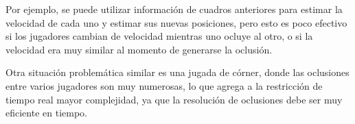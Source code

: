 Por ejemplo, se puede utilizar información de cuadros anteriores para
estimar la velocidad de cada uno y estimar sus nuevas posiciones, pero esto
es poco efectivo si los jugadores cambian de velocidad mientras uno ocluye
al otro, o si la velocidad era muy similar al momento de generarse la oclusión.

Otra situación problemática similar es una jugada de córner, donde las
oclusiones entre varios jugadores son muy numerosas, lo que agrega a la
restricción de tiempo real mayor complejidad, ya que la resolución de
oclusiones debe ser muy eficiente en tiempo.

